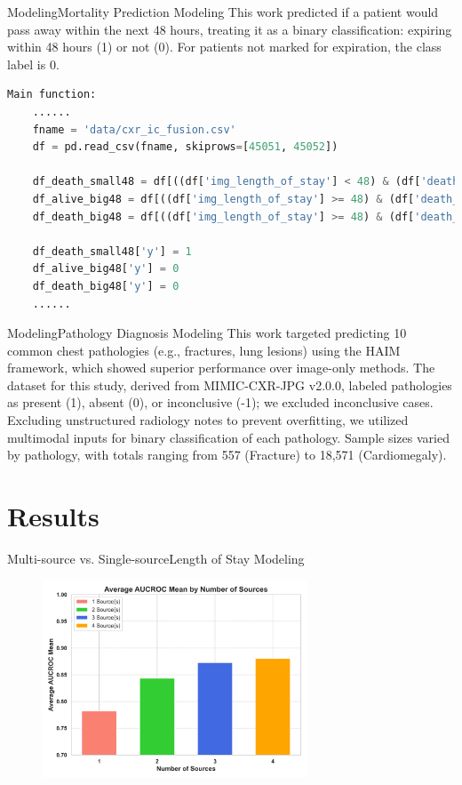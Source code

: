 \documentclass{sintefbeamer}
\theoremstyle{definition}
\begin{document}
\begin{frame}[fragile]{Modeling}{Mortality Prediction Modeling}
\small
This work predicted if a patient would pass away within the next 48 hours, treating it as a binary classification: expiring within 48 hours (1) or not (0). For patients not marked for expiration, the class label is 0.

\begin{lstlisting}[language=Python]
Main function:
    ......
    fname = 'data/cxr_ic_fusion.csv'
    df = pd.read_csv(fname, skiprows=[45051, 45052])

    df_death_small48 = df[((df['img_length_of_stay'] < 48) & (df['death_status'] == 1))]
    df_alive_big48 = df[((df['img_length_of_stay'] >= 48) & (df['death_status'] == 0))]
    df_death_big48 = df[((df['img_length_of_stay'] >= 48) & (df['death_status'] == 1))]

    df_death_small48['y'] = 1
    df_alive_big48['y'] = 0
    df_death_big48['y'] = 0
    ......
\end{lstlisting}


\end{frame}

\begin{frame}{Modeling}{Pathology Diagnosis Modeling}
\small
This work targeted predicting 10 common chest pathologies (e.g., fractures, lung lesions) using the HAIM framework, which showed superior performance over image-only methods. The dataset for this study, derived from MIMIC-CXR-JPG v2.0.0, labeled pathologies as present (1), absent (0), or inconclusive (-1); we excluded inconclusive cases. Excluding unstructured radiology notes to prevent overfitting, we utilized multimodal inputs for binary classification of each pathology. Sample sizes varied by pathology, with totals ranging from 557 (Fracture) to 18,571 (Cardiomegaly).
\end{frame}


\section{Results}

\begin{frame}{Multi-source vs. Single-source}{Length of Stay Modeling}

\begin{figure}[htbp]
  \centering
  \includegraphics[width=0.7\textwidth]{images/average_auc_by_sources.png}
  \label{fig:ex1}	
\end{figure}
\end{frame}
\end{document}
